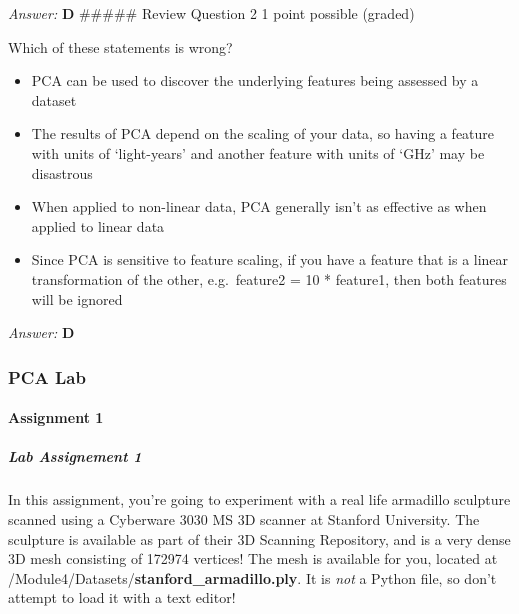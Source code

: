 \documentclass[11pt]{article}
\providecommand{\tightlist}{%
      \setlength{\itemsep}{0pt}\setlength{\parskip}{0pt}}
\begin{document}
\emph{Answer:} \textbf{D} \#\#\#\#\# Review Question 2 1 point possible
(graded)

Which of these statements is wrong?

\begin{itemize}
\tightlist
\item
  PCA can be used to discover the underlying features being assessed by
  a dataset
\item
  The results of PCA depend on the scaling of your data, so having a
  feature with units of `light-years' and another feature with units of
  `GHz' may be disastrous
\item
  When applied to non-linear data, PCA generally isn't as effective as
  when applied to linear data
\item
  Since PCA is sensitive to feature scaling, if you have a feature that
  is a linear transformation of the other, e.g.~feature2 = 10 *
  feature1, then both features will be ignored
\end{itemize}

\emph{Answer:} \textbf{D}

    \subsubsection{PCA Lab}\label{pca-lab}

\paragraph{Assignment 1}\label{assignment-1}

\subparagraph{Lab Assignement 1}\label{lab-assignement-1}

In this assignment, you're going to experiment with a real life
armadillo sculpture scanned using a Cyberware 3030 MS 3D scanner at
Stanford University. The sculpture is available as part of their 3D
Scanning Repository, and is a very dense 3D mesh consisting of 172974
vertices! The mesh is available for you, located at
/Module4/Datasets/\textbf{stanford\_armadillo.ply}. It is \emph{not} a
Python file, so don't attempt to load it with a text editor!
\end{document}
